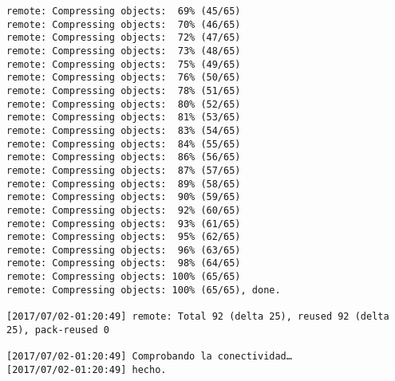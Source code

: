 \begin{verbatim}
remote: Compressing objects:  69% (45/65)           
remote: Compressing objects:  70% (46/65)           
remote: Compressing objects:  72% (47/65)           
remote: Compressing objects:  73% (48/65)           
remote: Compressing objects:  75% (49/65)           
remote: Compressing objects:  76% (50/65)           
remote: Compressing objects:  78% (51/65)           
remote: Compressing objects:  80% (52/65)           
remote: Compressing objects:  81% (53/65)           
remote: Compressing objects:  83% (54/65)           
remote: Compressing objects:  84% (55/65)           
remote: Compressing objects:  86% (56/65)           
remote: Compressing objects:  87% (57/65)           
remote: Compressing objects:  89% (58/65)           
remote: Compressing objects:  90% (59/65)           
remote: Compressing objects:  92% (60/65)           
remote: Compressing objects:  93% (61/65)           
remote: Compressing objects:  95% (62/65)           
remote: Compressing objects:  96% (63/65)           
remote: Compressing objects:  98% (64/65)           
remote: Compressing objects: 100% (65/65)           
remote: Compressing objects: 100% (65/65), done.        

[2017/07/02-01:20:49] remote: Total 92 (delta 25), reused 92 (delta 25), pack-reused 0        

[2017/07/02-01:20:49] Comprobando la conectividad… 
[2017/07/02-01:20:49] hecho.

\end{verbatim}

